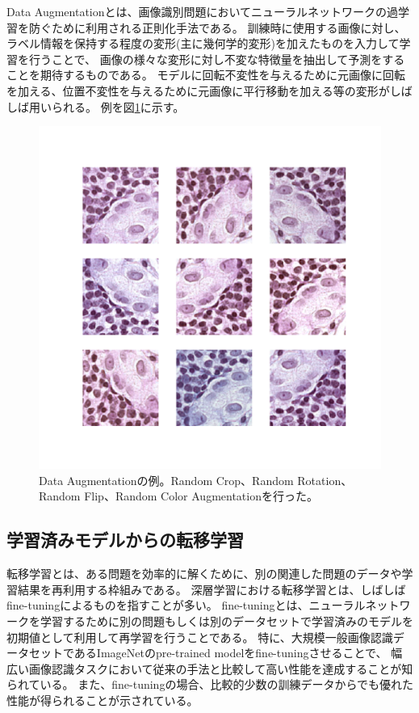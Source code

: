 Data Augmentationとは、画像識別問題においてニューラルネットワークの過学習を防ぐために利用される正則化手法である。
訓練時に使用する画像に対し、ラベル情報を保持する程度の変形(主に幾何学的変形)を加えたものを入力して学習を行うことで、
画像の様々な変形に対し不変な特徴量を抽出して予測をすることを期待するものである。
モデルに回転不変性を与えるために元画像に回転を加える、位置不変性を与えるために元画像に平行移動を加える等の変形がしばしば用いられる。
例を図\ref{fig:data_augmentation}に示す。

\begin{figure}[tbp]
    \label{fig:data_augmentation}
     \begin{center}
      \includegraphics[width=12cm]{figures/data_augmentation.pdf}
     \end{center}
    \caption{Data Augmentationの例。Random Crop、Random Rotation、Random Flip、Random Color Augmentationを行った。}
\end{figure}

\subsection{学習済みモデルからの転移学習}
\label{sec:transfer}
転移学習とは、ある問題を効率的に解くために、別の関連した問題のデータや学習結果を再利用する枠組みである。
深層学習における転移学習とは、しばしばfine-tuningによるものを指すことが多い。
fine-tuningとは、ニューラルネットワークを学習するために別の問題もしくは別のデータセットで学習済みのモデルを初期値として利用して再学習を行うことである。
特に、大規模一般画像認識データセットであるImageNet\cite{imagenet_cvpr09}のpre-trained modelをfine-tuningさせることで、
幅広い画像認識タスクにおいて従来の手法と比較して高い性能を達成することが知られている\cite{girshick2014rich, agrawal2014analyzing}。
また、fine-tuningの場合、比較的少数の訓練データからでも優れた性能が得られることが示されている。

